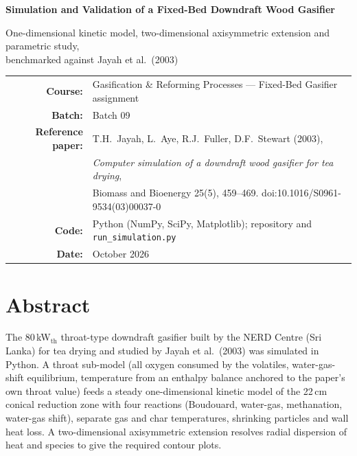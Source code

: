 \documentclass[11pt,a4paper]{article}
\begin{document}
\begin{titlepage}
\centering
\vspace*{2cm}
{\LARGE\bfseries\color{primary} Simulation and Validation of a Fixed-Bed Downdraft Wood Gasifier\par}
\vspace{0.6cm}
{\large One-dimensional kinetic model, two-dimensional axisymmetric extension and parametric study,\\ benchmarked against Jayah et al.\ (2003)\par}
\vspace{2cm}
\small\begin{tabular}{rl}
\textbf{Course:} & Gasification \& Reforming Processes --- Fixed-Bed Gasifier assignment\\[2pt]
\textbf{Batch:} & Batch 09\\[2pt]
\textbf{Reference paper:} & T.H.\ Jayah, L.\ Aye, R.J.\ Fuller, D.F.\ Stewart (2003),\\
 & \emph{Computer simulation of a downdraft wood gasifier for tea drying},\\
 & Biomass and Bioenergy 25(5), 459--469. doi:10.1016/S0961-9534(03)00037-0\\[2pt]
\textbf{Code:} & Python (NumPy, SciPy, Matplotlib); repository and \texttt{run\_simulation.py}\\[2pt]
\textbf{Date:} & October 2026\\
\end{tabular}
\vfill
\end{titlepage}

\tableofcontents
\newpage

\section{Abstract}
The 80\,kW$_\text{th}$ throat-type downdraft gasifier built by the NERD Centre (Sri Lanka) for tea drying and studied by Jayah et al.\ (2003) was simulated in Python. A throat sub-model (all oxygen consumed by the volatiles, water-gas-shift equilibrium, temperature from an enthalpy balance anchored to the paper's own throat value) feeds a steady one-dimensional kinetic model of the 22\,cm conical reduction zone with four reactions (Boudouard, water-gas, methanation, water-gas shift), separate gas and char temperatures, shrinking particles and wall heat loss. A two-dimensional axisymmetric extension resolves radial dispersion of heat and species to give the required contour plots.
\end{document}
